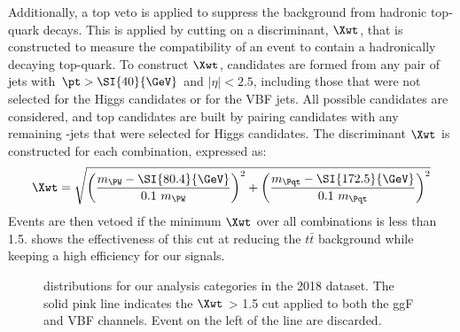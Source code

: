 Additionally, a top veto is applied to suppress the background from hadronic top-quark decays.
This is applied by cutting on a discriminant, $\Xwt$, that is constructed to measure the compatibility of an event to contain a hadronically decaying top-quark.
To construct $\Xwt$, \PW candidates are formed from any pair of jets with $\pt > \SI{40}{\GeV}$ and $|\eta| < 2.5$, including those that were not selected for the Higgs candidates or for the VBF jets.
All possible \PW candidates are considered, and top candidates are built by pairing \PW candidates with any remaining \Pqb-jets that were selected for Higgs candidates.
The discriminant $\Xwt$ is constructed for each combination, expressed as:
\begin{equation}
    \Xwt = \sqrt{\left(\frac{m_{\PW} - \SI{80.4}{\GeV}}{0.1 \ m_{\PW}}\right)^{2} + \left(\frac{m_{\Pqt} - \SI{172.5}{\GeV}}{0.1 \ m_{\Pqt}}\right)^{2}}
    \label{eqn:xwt}
\end{equation}
Events are then vetoed if the minimum $\Xwt$ over all combinations is less than \num{1.5}.
\Fig{\ref{fig:Xwt}} shows the effectiveness of this cut at reducing the $t\bar{t}$ background while keeping a high efficiency for our signals.

\begin{figure}[ht]
	\centering
	\caption{\Xwt distributions for our analysis categories in the 2018 dataset.
	The solid pink line indicates the $\Xwt$ > 1.5 cut applied to both the ggF and VBF channels.
	Event on the left of the line are discarded.}
	\label{fig:Xwt}
\end{figure}


